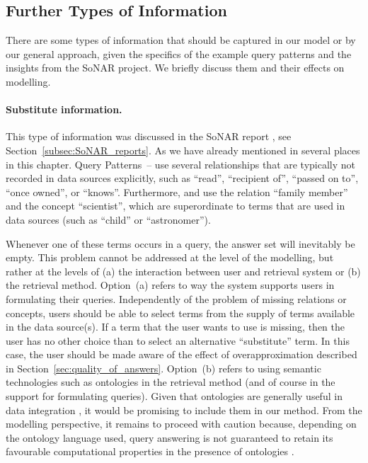 \subsection{Further Types of Information}
\label{subsec:further_information}

There are some types of information that should be captured in our model
or by our general approach,
given the specifics of the example query patterns
and the insights from the SoNAR project.
We briefly discuss them and their effects on modelling.

\paragraph{Substitute information.}

This type of information was discussed
in the SoNAR report \autocite{Fangerau2022}, see Section~\ref{subsec:SoNAR_reports}.
As we have already mentioned in several places in this chapter.
Query Patterns~-- use several relationships
that are typically not recorded in data sources explicitly, such as
\enquote{read}, \enquote{recipient of}, \enquote{passed on to},
\enquote{once owned}, or \enquote{knows}.
Furthermore,  and 
use the relation \enquote{family member} and the concept \enquote{scientist},
which are superordinate to terms that are used in data sources
(such as \enquote{child} or \enquote{astronomer}).

Whenever one of these terms occurs in a query,
the answer set will inevitably be empty.
This problem cannot be addressed at the level of the modelling,
but rather at the levels of (a) the interaction between user and retrieval system
or (b) the retrieval method.
Option~(a) refers to way the system supports users in formulating their queries.
Independently of the problem of missing relations or concepts, users should be able to 
select terms from the supply of terms available in the data source(s).
If a term that the user wants to use is missing, then the user has no other choice than
to select an alternative \enquote{substitute} term.
In this case, the user should be made aware of the effect of overapproximation
described in Section~\ref{sec:quality_of_answers}.
Option~(b) refers to using semantic technologies such as ontologies
in the retrieval method (and of course in the support for formulating queries).
Given that ontologies are generally useful in data integration \autocite[§12]{Doan2012},
it would be promising to include them in our method.
From the modelling perspective, it remains to proceed with caution
because, depending on the ontology language used,
query answering is not guaranteed to retain its favourable computational properties
in the presence of ontologies \autocite{Lutz2016,Xiao2018,Barcelo2019}.

